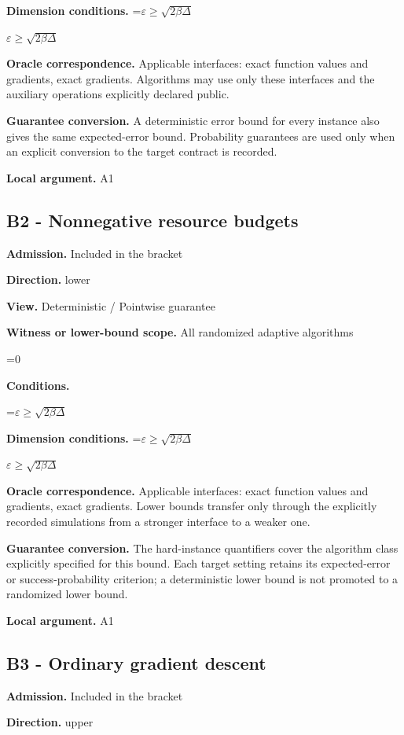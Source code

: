 \documentclass[10pt,a4paper]{article}
\newcommand{\AtlasMath}[1]{\par\begingroup\centering\setbox0=\hbox{$\displaystyle #1$}\ifdim\wd0>1.4\linewidth\typeout{ATLAS WIDE FORMULA: \the\wd0}\fi\ifdim\wd0>\linewidth\resizebox{\linewidth}{!}{\box0}\else\box0\fi\par\endgroup}
\newcommand{\AtlasInlineMath}[1]{\begingroup\setbox0=\hbox{$#1$}\ifdim\wd0>.4\linewidth\endgroup\AtlasMath{#1}\else\endgroup$#1$\fi}
\begin{document}
\textbf{Dimension conditions.} \AtlasInlineMath{\varepsilon\ge\sqrt{2\beta\Delta}}

\textbf{Oracle correspondence.} Applicable interfaces: exact function values and gradients, exact gradients. Algorithms may use only these interfaces and the auxiliary operations explicitly declared public.

\textbf{Guarantee conversion.} A deterministic error bound for every instance also gives the same expected-error bound. Probability guarantees are used only when an explicit conversion to the target contract is recorded.

\textbf{Local argument.} A1

\subsection{B2 - Nonnegative resource budgets}
\textbf{Admission.} Included in the bracket

\textbf{Direction.} lower

\textbf{View.} Deterministic / Pointwise guarantee

\textbf{Witness or lower-bound scope.} All randomized adaptive algorithms

\AtlasMath{0}
\textbf{Conditions.} 


\AtlasMath{\varepsilon\ge\sqrt{2\beta\Delta}}




\textbf{Dimension conditions.} \AtlasInlineMath{\varepsilon\ge\sqrt{2\beta\Delta}}

\textbf{Oracle correspondence.} Applicable interfaces: exact function values and gradients, exact gradients. Lower bounds transfer only through the explicitly recorded simulations from a stronger interface to a weaker one.

\textbf{Guarantee conversion.} The hard-instance quantifiers cover the algorithm class explicitly specified for this bound. Each target setting retains its expected-error or success-probability criterion; a deterministic lower bound is not promoted to a randomized lower bound.

\textbf{Local argument.} A1

\subsection{B3 - Ordinary gradient descent}
\textbf{Admission.} Included in the bracket

\textbf{Direction.} upper
\end{document}
